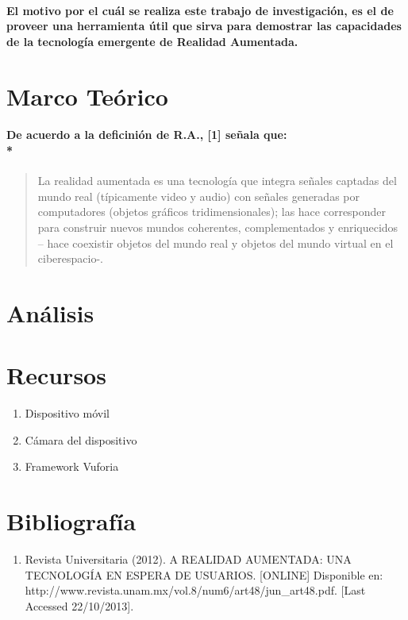 \documentclass[11pt]{article} %
\begin{document}
\paragraph{
El motivo por el cuál se realiza este trabajo de investigación, es el de proveer una herramienta útil que sirva para demostrar las capacidades de la tecnología emergente de Realidad Aumentada.
 }
\section{Marco Teórico}

\paragraph{
De acuerdo a la deficinión de R.A., [1] señala que:\\*  } \begin{quote} La realidad aumentada es una tecnología que integra señales captadas del mundo real (típicamente video y audio) con señales generadas por computadores (objetos gráficos tridimensionales); las hace corresponder para construir nuevos mundos coherentes, complementados y enriquecidos – hace coexistir objetos del mundo real y objetos del mundo virtual en el ciberespacio-.\end{quote} 
\section{Análisis}
\section{Recursos}

\begin{enumerate} 
	 \item Dispositivo móvil
	 \item Cámara del dispositivo
	 \item Framework Vuforia
	
 \end{enumerate}
\section{Bibliografía}
\begin{enumerate} 
 \item Revista Universitaria (2012). A REALIDAD AUMENTADA: UNA TECNOLOGÍA EN ESPERA DE USUARIOS. [ONLINE] Disponible en: http://www.revista.unam.mx/vol.8/num6/art48/jun\_art48.pdf. [Last Accessed 22/10/2013].

 \end{enumerate}
\end{document}
